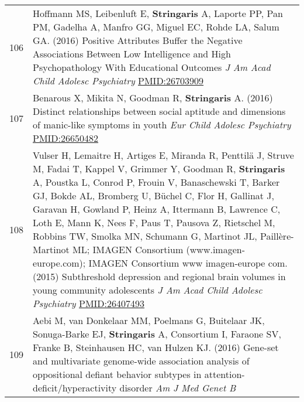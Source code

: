 \documentclass[
]{article}
\begin{document}
\begin{longtable}[]{@{}ll@{}}
\begin{minipage}[t]{0.01\columnwidth}
106\strut
\end{minipage} & \begin{minipage}[t]{0.94\columnwidth}\raggedright
Hoffmann MS, Leibenluft E, \textbf{Stringaris} A, Laporte PP, Pan PM,
Gadelha A, Manfro GG, Miguel EC, Rohde LA, Salum GA. (2016) Positive
Attributes Buffer the Negative Associations Between Low Intelligence and
High Psychopathology With Educational Outcomes \emph{J Am Acad Child
Adolesc Psychiatry} \url{PMID:26703909}\strut
\end{minipage}\tabularnewline
\begin{minipage}[t]{0.01\columnwidth}\raggedright
107\strut
\end{minipage} & \begin{minipage}[t]{0.94\columnwidth}\raggedright
Benarous X, Mikita N, Goodman R, \textbf{Stringaris} A. (2016) Distinct
relationships between social aptitude and dimensions of manic-like
symptoms in youth \emph{Eur Child Adolesc Psychiatry}
\url{PMID:26650482}\strut
\end{minipage}\tabularnewline
\begin{minipage}[t]{0.01\columnwidth}\raggedright
108\strut
\end{minipage} & \begin{minipage}[t]{0.94\columnwidth}\raggedright
Vulser H, Lemaitre H, Artiges E, Miranda R, Penttilä J, Struve M, Fadai
T, Kappel V, Grimmer Y, Goodman R, \textbf{Stringaris} A, Poustka L,
Conrod P, Frouin V, Banaschewski T, Barker GJ, Bokde AL, Bromberg U,
Büchel C, Flor H, Gallinat J, Garavan H, Gowland P, Heinz A, Ittermann
B, Lawrence C, Loth E, Mann K, Nees F, Paus T, Pausova Z, Rietschel M,
Robbins TW, Smolka MN, Schumann G, Martinot JL, Paillère-Martinot ML;
IMAGEN Consortium (www.imagen-europe.com); IMAGEN Consortium www
imagen-europe com. (2015) Subthreshold depression and regional brain
volumes in young community adolescents \emph{J Am Acad Child Adolesc
Psychiatry} \url{PMID:26407493}\strut
\end{minipage}\tabularnewline
\begin{minipage}[t]{0.01\columnwidth}\raggedright
109\strut
\end{minipage} & \begin{minipage}[t]{0.94\columnwidth}\raggedright
Aebi M, van Donkelaar MM, Poelmans G, Buitelaar JK, Sonuga-Barke EJ,
\textbf{Stringaris} A, Consortium I, Faraone SV, Franke B, Steinhausen
HC, van Hulzen KJ. (2016) Gene-set and multivariate genome-wide
association analysis of oppositional defiant behavior subtypes in
attention-deficit/hyperactivity disorder \emph{Am J Med Genet B
}
\end{minipage}
\end{longtable}
\end{document}
